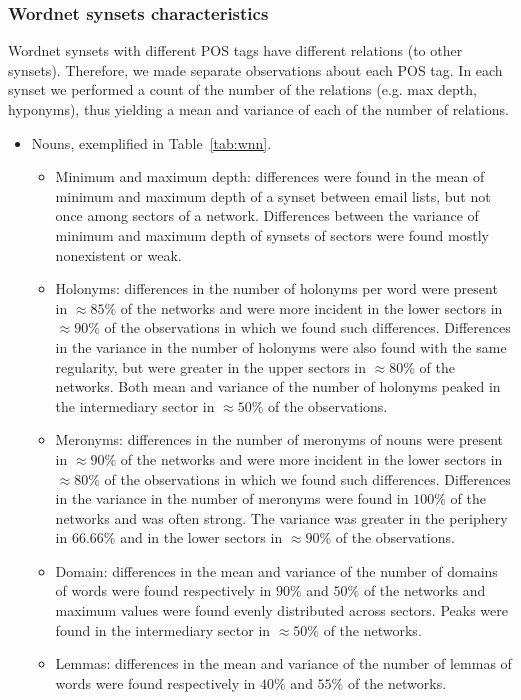 \subsubsection{Wordnet synsets characteristics}\label{subsec:wn1}
Wordnet synsets with different POS tags have different relations (to other synsets).
Therefore, we made separate observations about each POS tag.
In each synset we performed a count of the number of the relations (e.g. max depth, hyponyms),
thus yielding a mean and variance of each of the number of relations.
\begin{itemize}
\item Nouns, exemplified in Table~\ref{tab:wnn}.
\begin{itemize}
\item Minimum and maximum depth: 
differences were found in the mean of minimum and maximum depth of a synset between email lists,
but not once among sectors of a network.
Differences between the variance of minimum and maximum depth of synsets of sectors were found mostly nonexistent or weak.
\item Holonyms:
differences in the number of holonyms per word were present in $\approx 85\%$ of the networks and were
more incident in the lower sectors in $\approx 90\%$ of the observations in which we found such differences.
Differences in the variance in the number of holonyms were also found with the same regularity,
but were greater in the upper sectors in $\approx 80\%$ of the networks.
Both mean and variance of the number of holonyms peaked in the intermediary sector in $\approx50\%$ of the observations.
\item Meronyms:
differences in the number of meronyms of nouns were present in $\approx 90\%$ of the networks and were
more incident in the lower sectors in $\approx 80\%$ of the observations in which we found such differences.
Differences in the variance in the number of meronyms were found in $100\%$ of the networks and was often strong.
The variance was greater in the periphery in $66.66\%$ and in the lower sectors in $\approx 90\%$ of the observations.
\item Domain:
differences in the mean and variance of the number of domains of words were found respectively in $90\%$ and $50\%$ of the networks and maximum values were found evenly distributed across sectors.
Peaks were found in the intermediary sector in $\approx 50\%$ of the networks.
\item Lemmas:
differences in the mean and variance of the number of lemmas of words were found respectively in $40\%$ and $55\%$ of the networks.

\end{itemize}
\end{itemize}
